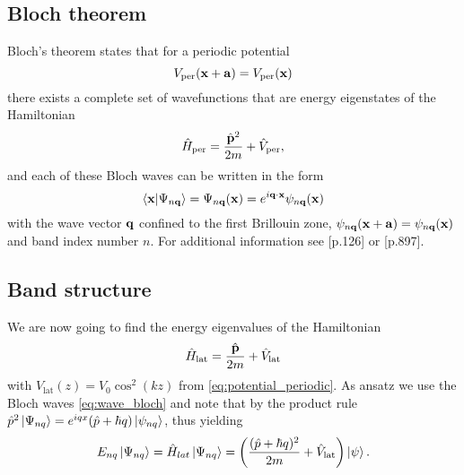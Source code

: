 \subsection{Bloch theorem}

Bloch's theorem states that for a periodic potential
\begin{equation}
  V_\text{per}(\vb{x}+\vb{a})=V_\text{per}(\vb{x})
  \label{eq:potential_periodic}
\end{equation}
there exists a complete set of wavefunctions that are energy eigenstates
of the Hamiltonian
\begin{equation}
  \hat{H}_\text{per}
  =\frac{\hat{\vb{p}}^2}{2m}+\hat{V}_\text{per}
  \label{eq:hamiltonian_periodic},
\end{equation}
and each of these Bloch waves can be written in the form
\begin{equation}
  \bra{\vb{x}}\ket{\Psi_{n\vb{q}}}
  =\Psi_{n\vb{q}}(\vb{x})
  =e^{i\vb{q}\cdot\vb{x}}\psi_{n\vb{q}}(\vb{x})
  \label{eq:wave_bloch}
\end{equation}
with the wave vector $\vb{q}$ confined to the first Brillouin zone,
$\psi_{n\vb{q}}(\vb{x}+\vb{a})=\psi_{n\vb{q}}(\vb{x})$ and band index number
$n$. For additional information see \cite{Roessler2004}[p.126] or
\cite{Bartelmann2018}[p.897].

\subsection{Band structure}

We are now going to find the energy eigenvalues of the Hamiltonian
\begin{equation}
  \hat{H}_\text{lat}
  =\frac{\hat{\vb{p}}}{2m}+\hat{V}_\text{lat}
  \label{eq:hamiltonian_lattice}
\end{equation}
with $V_\text{lat}(z)=V_0\cos^2(kz)$ from \cref{eq:potential_periodic}. As
ansatz we use the Bloch waves \cref{eq:wave_bloch} and note that by the
product rule
$\hat{p}^2\ket{\Psi_{nq}}=e^{iqx}(\hat{p}+\hbar q)\ket{\psi_{nq}}$,
thus yielding
\begin{equation}
  E_{nq}\ket{\Psi_{nq}}
  =\hat{H}_{lat}\ket{\Psi_{nq}}
  =\left(\frac{(\hat{p}+\hbar q)^2}{2m}+\hat{V}_\text{lat}\right)\ket{\psi}
  \label{eq:eigenvalue_energy_lattice}.
\end{equation}

